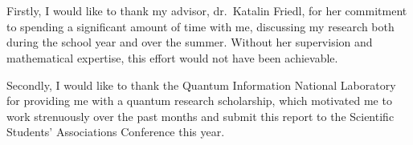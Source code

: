 \chapter*{\koszonetnyilvanitas}

Firstly, I would like to thank my advisor, dr.~Katalin Friedl, for her commitment to spending a significant amount of time with me, discussing my research both during the school year and over the summer. Without her supervision and mathematical expertise, this effort would not have been achievable.

Secondly, I would like to thank the Quantum Information National Laboratory for providing me with a quantum research scholarship, which motivated me to work strenuously over the past months and submit this report to the Scientific Students' Associations Conference this year.